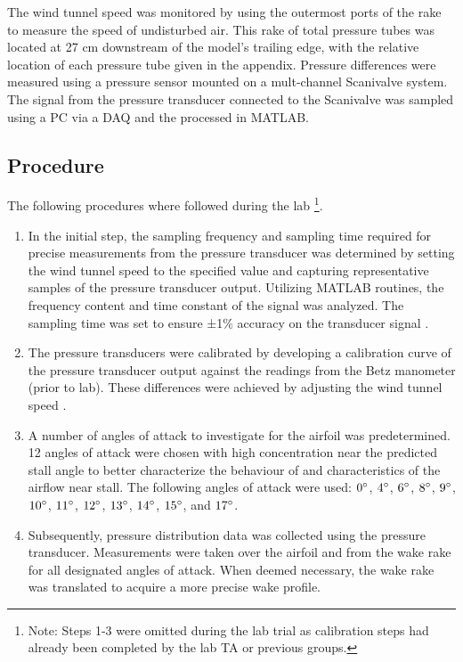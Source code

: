 \documentclass[11pt, letterpaper]{article}
\begin{document}
The wind tunnel speed was monitored by using the outermost ports of the rake to measure the speed of undisturbed air. This rake of total pressure tubes was located at 27 cm downstream of the model's trailing edge, with the relative location of each pressure tube given in the appendix. Pressure differences were measured using a pressure sensor mounted on a mult-channel Scanivalve system. The signal from the pressure transducer connected to the Scanivalve was sampled using a PC via a DAQ and the processed in MATLAB.

\subsection{Procedure}
The following procedures where followed during the lab \footnote{Note: Steps 1-3 were omitted during the lab trial as calibration steps had already been completed by the lab TA or previous groups.}.
\begin{enumerate}
    \item In the initial step, the sampling frequency and sampling time required for precise measurements from the pressure transducer was determined by setting the wind tunnel speed to the specified value and capturing representative samples of the pressure transducer output. Utilizing MATLAB routines, the frequency content and time constant of the signal was analyzed. The sampling time was set to ensure ±1\% accuracy on the transducer signal \cite{lab_manual}.
    \item The pressure transducers were calibrated by developing a calibration curve of the pressure transducer output against the readings from the Betz manometer (prior to lab). These differences were achieved by adjusting the wind tunnel speed \cite{lab_manual}.
    \item A number of angles of attack to investigate for the airfoil was predetermined. 12 angles of attack were chosen with high concentration near the predicted stall angle to better characterize the behaviour of and characteristics of the airflow near stall. The following angles of attack were used: $0\degree$, $4\degree$, $6\degree$, $8\degree$, $9\degree$, $10\degree$, $11\degree$, $12\degree$, $13\degree$, $14\degree$, $15\degree$, and $17\degree$. 
    \item Subsequently, pressure distribution data was collected using the  pressure transducer. Measurements were taken over the airfoil and from the wake rake for all designated angles of attack. When deemed necessary, the wake rake was translated to acquire a more precise wake profile.
\end{enumerate}
\end{document}
